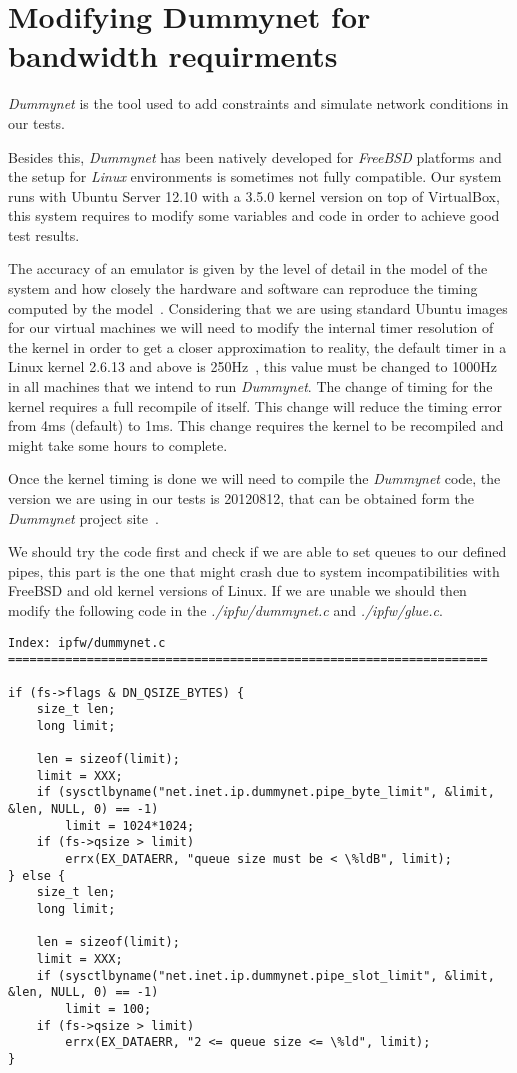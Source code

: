 \section{Modifying Dummynet for bandwidth requirments}
\label{sec:dummynet}

\thispagestyle{empty}

{\it Dummynet} is the tool used to add constraints and simulate network conditions in our tests. 

Besides this, {\it Dummynet} has been natively developed for {\it FreeBSD} platforms and the setup for {\it Linux} environments is sometimes not fully compatible. Our system runs with Ubuntu Server 12.10 with a 3.5.0 kernel version on top of VirtualBox, this system requires to modify some variables and code in order to achieve good test results.

The accuracy of an emulator is given by the level of detail in the model of the system and how closely the hardware and software can reproduce the timing computed by the model~\cite{dummynetRevisited}. Considering that we are using standard Ubuntu images for our virtual machines we will need to modify the internal timer resolution of the kernel in order to get a closer approximation to reality, the default timer in a Linux kernel  2.6.13 and above is 250Hz~\cite{linuxKernelTime}, this value must be changed to 1000Hz in all machines that we intend to run {\it Dummynet}. The change of timing for the kernel requires a full recompile of itself. This change will reduce the timing error from 4ms (default) to 1ms. This change requires the kernel to be recompiled and might take some hours to complete.

Once the kernel timing is done we will need to compile the {\it Dummynet} code, the version we are using in our tests is 20120812, that can be obtained form the {\it Dummynet} project site~\cite{dummynetTool}.

We should try the code first and check if we are able to set queues to our defined pipes, this part is the one that might crash due to system incompatibilities with FreeBSD and old kernel versions of Linux.  If we are unable we should then modify the following code in the {\it ./ipfw/dummynet.c} and {\it ./ipfw/glue.c}.

\begin{lstlisting}
Index: ipfw/dummynet.c
===================================================================

if (fs->flags & DN_QSIZE_BYTES) {
	size_t len;
	long limit;

	len = sizeof(limit);
	limit = XXX;
	if (sysctlbyname("net.inet.ip.dummynet.pipe_byte_limit", &limit, &len, NULL, 0) == -1)
		limit = 1024*1024;
	if (fs->qsize > limit)
		errx(EX_DATAERR, "queue size must be < \%ldB", limit);
} else {
	size_t len;
	long limit;

	len = sizeof(limit);
	limit = XXX;
	if (sysctlbyname("net.inet.ip.dummynet.pipe_slot_limit", &limit, &len, NULL, 0) == -1)
		limit = 100;
	if (fs->qsize > limit)
		errx(EX_DATAERR, "2 <= queue size <= \%ld", limit);
}
\end{lstlisting}

